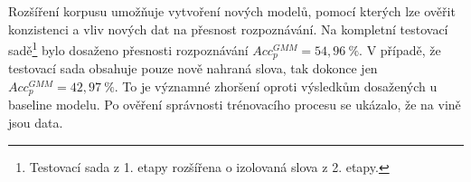 Rozšíření korpusu umožňuje vytvoření nových modelů, pomocí kterých lze ověřit konzistenci a vliv nových dat na přesnost rozpoznávání.
Na kompletní testovací sadě\footnote{Testovací sada z 1. etapy rozšířena o izolovaná slova z 2. etapy.} bylo dosaženo přesnosti rozpoznávání $Acc_{p}^{GMM} = 54,96~\%$.
V případě, že testovací sada obsahuje pouze nově nahraná slova, tak dokonce jen $Acc_{p}^{GMM} = 42,97~\%$.
To je významné zhoršení oproti výsledkům dosažených u baseline modelu.
Po ověření správnosti trénovacího procesu se ukázalo, že na vině jsou data.




